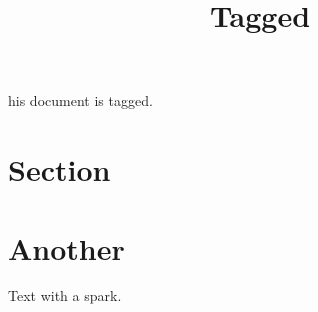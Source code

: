 \documentclass[10pt,a4paper]{article}
\title{Tagged}
\begin{document}
his document is tagged. \lipsum[1]
\section{Section}\lipsum[2-4]
\limenrule
\section{Another}Text with \limenspark{} a spark.
\end{document}
